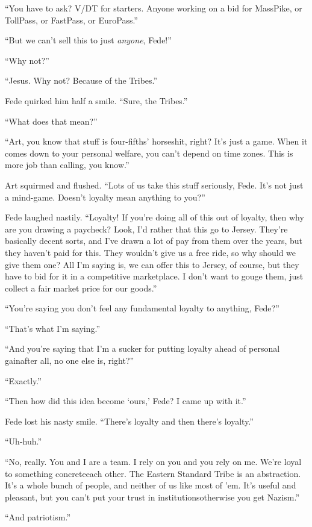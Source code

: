 “You have to ask? V/DT for starters. Anyone working on a bid for
MassPike, or TollPass, or FastPass, or EuroPass.”

“But we can’t sell this to just \emph{anyone}, Fede!”

“Why not?”

“Jesus. Why not? Because of the Tribes.”

Fede quirked him half a smile. “Sure, the Tribes.”

“What does that mean?”

“Art, you know that stuff is four-fifths’ horseshit, right? It’s
just a game. When it comes down to your personal welfare, you can’t
depend on time zones. This is more job than calling, you know.”

Art squirmed and flushed. “Lots of us take this stuff seriously,
Fede. It’s not just a mind-game. Doesn’t loyalty mean anything to
you?”

Fede laughed nastily. “Loyalty! If you’re doing all of this out of
loyalty, then why are you drawing a paycheck? Look, I’d rather that
this go to Jersey. They’re basically decent sorts, and I’ve drawn a
lot of pay from them over the years, but they haven’t paid for
this. They wouldn’t give us a free ride, so why should we give them
one? All I’m saying is, we can offer this to Jersey, of course, but
they have to bid for it in a competitive marketplace. I don’t want
to gouge them, just collect a fair market price for our goods.”

“You’re saying you don’t feel any fundamental loyalty to anything,
Fede?”

“That’s what I’m saying.”

“And you’re saying that I’m a sucker for putting loyalty ahead of
personal gain{\dash}after all, no one else is, right?”

“Exactly.”

“Then how did this idea become ‘ours,’ Fede? I came up with it.”

Fede lost his nasty smile. “There’s loyalty and then there’s
loyalty.”

“Uh-huh.”

“No, really. You and I are a team. I rely on you and you rely on
me. We’re loyal to something concrete{\dash}each other. The Eastern
Standard Tribe is an abstraction. It’s a whole bunch of people, and
neither of us like most of ’em. It’s useful and pleasant, but you
can’t put your trust in institutions{\dash}otherwise you get Nazism.”

“And patriotism.”


